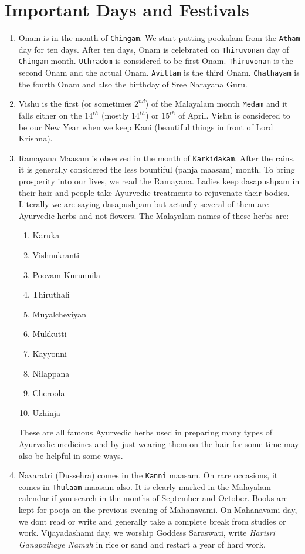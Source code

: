 \documentclass[10pt,twoside]{article}
\begin{document}
\section{Important Days and Festivals}
\begin{enumerate}
\item Onam is in the month of \verb|Chingam|. We start putting pookalam from the \verb|Atham| day for ten days. After ten days, Onam is celebrated on \verb|Thiruvonam| day of \verb|Chingam| month. \verb|Uthradom| is considered to be first Onam. \verb|Thiruvonam| is the second Onam and the actual Onam. \verb|Avittam| is the third Onam. \verb|Chathayam| is the fourth Onam and also the birthday of Sree Narayana Guru.
\item Vishu is the first (or sometimes $2^{nd}$) of the Malayalam month \verb|Medam| and it falls either on the $14^{th}$ (mostly $14^{th}$) or $15^{th}$ of April. Vishu is considered to be our New Year when we keep Kani (beautiful things in front of Lord Krishna).
\item Ramayana Maasam is observed in the month of \verb|Karkidakam|. After the rains, it is generally considered the less bountiful (panja maasam) month. To bring prosperity into our lives, we read the Ramayana. Ladies keep dasapushpam in their hair and people take Ayurvedic treatments to rejuvenate their bodies. Literally we are saying dasapushpam but actually several of them are Ayurvedic herbs and not flowers. The Malayalam names of these herbs are:
\begin{enumerate}
\item Karuka 
\item Vishnukranti
\item Poovam Kurunnila
\item Thiruthali
\item Muyalcheviyan
\item Mukkutti
\item Kayyonni
\item Nilappana
\item Cheroola
\item Uzhinja
\end{enumerate} 
These are all famous Ayurvedic herbs used in preparing many types of Ayurvedic medicines and by just wearing them on the hair for some time may also be helpful in some ways.
\item Navaratri (Dussehra) comes in the \verb|Kanni| maasam. On rare occasions, it comes in \verb|Thulaam| maasam also. It is clearly marked in the Malayalam calendar if you search in the months of September and October. Books are kept for pooja on the previous evening of Mahanavami. On Mahanavami day,  we dont read or write and generally take a complete break from studies or work. Vijayadashami day, we worship Goddess Saraswati, write \emph{Harisri Ganapathaye Namah} in rice or sand and restart a year of hard work.

\end{enumerate}
\end{document}
